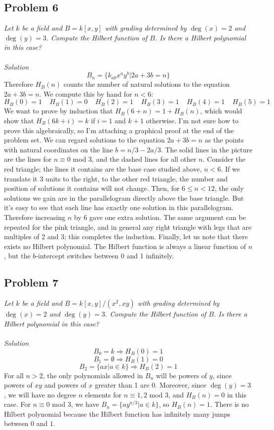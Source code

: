 \documentclass[12 pt]{article}
\begin{document}
\subsection*{Problem 6}
\emph{Let $k$ be a field and $B = k[x, y]$ with grading determined by $\deg(x) = 2$ and $\deg(y) = 3$. Compute the Hilbert function of $B$. Is there a Hilbert polynomial in this case?}
\\
\\
\emph{Solution}
\\
\[     B_n = \{ k_{ab} x^a y^b | 2a + 3b = n  \}     \]
Therefore $H_B(n)$ counts the number of natural solutions to the equation $2a+3b = n$. We compute this by hand for $n<6$:
\[    H_B(0) = 1 \;\;\;\; H_B(1) = 0 \;\;\;\;H_B(2) = 1 \;\;\;\;H_B(3) = 1 \;\;\;\;H_B(4) = 1 \;\;\;\;H_B(5) = 1     \]
We want to prove by induction that $H_B(6+n) = 1+ H_B(n)$, which would show that $H_B(6k+i) = k$ if $i=1$ and $k+1$ otherwise. I'm not sure how to prove this algebraically, so I'm attaching a graphical proof at the end of the problem set. We can regard solutions to the equation $2a + 3b = n$ as the points with natural coordinates on the line $b = n/3 - 2a/3$. The solid lines in the picture are the lines for $n \equiv 0$ mod $3$, and the dashed lines for all other $n$. Consider the red triangle; the lines it contains are the base case studied above, $n<6$. If we translate it 3 units to the right, to the other red triangle, the number and position of solutions it contains will not change. Then, for $6\leq n <12$, the only solutions we gain are in the parallelogram directly above the base triangle. But it's easy to see that each line has exactly one solution in this parallelogram. Therefore increasing $n$ by 6 gave one extra solution. The same argument can be repeated for the pink triangle, and in general any right triangle with legs that are multiples of 2 and 3; this completes the induction. Finally, let us note that there exists no Hilbert polynomial. The Hilbert function is always a linear function of $n$, but the $b$-intercept switches between 0 and 1 infinitely.

\subsection*{Problem 7}
\emph{Let $k$ be a field and $B = k[x, y]/(x^2, xy)$ with grading determined by $\deg(x) = 2$ and $\deg(y) = 3$. Compute the Hilbert function of $B$. Is there a Hilbert polynomial in this case?}
\\
\\
\emph{Solution}
\\
\[   B_0 = k \Rightarrow H_B(0) = 1   \]
\[   B_1 = \emptyset \Rightarrow H_B(1) = 0    \]
\[   B_2 = \{ ax | a\in k \}  \Rightarrow H_B(2) = 1 \]
For all $n>2$, the only polynomials allowed in $B_n$ will be powers of $y$, since powers of $xy$ and powers of $x$ greater than 1 are 0. Moreover, since $\deg(y) = 3$, we will have no degree $n$ elements for $n \equiv 1,2$ mod $3$, and $H_B(n) = 0$ in this case. For $n\equiv 0$ mod $3$, we have $B_n = \{ a y^{n/3} | a\in k \}$, so $H_B(n) = 1$. There is no Hilbert polynomial because the Hilbert function has infinitely many jumps between $0$ and $1$.
\end{document}
